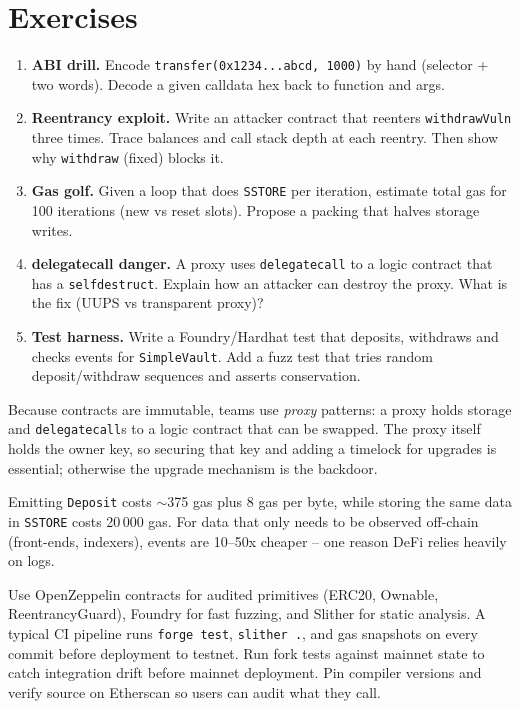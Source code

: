 \section{Exercises}\label{sec:ch04-exercises}
\begin{enumerate}[label=E4.\arabic*, leftmargin=*, itemsep=0.6em]
    \item \textbf{ABI drill.} Encode \texttt{transfer(0x1234...abcd, 1000)} by hand (selector + two words). Decode a given calldata hex back to function and args.
    \item \textbf{Reentrancy exploit.} Write an attacker contract that reenters \texttt{withdrawVuln} three times. Trace balances and call stack depth at each reentry. Then show why \texttt{withdraw} (fixed) blocks it.
    \item \textbf{Gas golf.} Given a loop that does \texttt{SSTORE} per iteration, estimate total gas for 100 iterations (new vs reset slots). Propose a packing that halves storage writes.
    \item \textbf{delegatecall danger.} A proxy uses \texttt{delegatecall} to a logic contract that has a \texttt{selfdestruct}. Explain how an attacker can destroy the proxy. What is the fix (UUPS vs transparent proxy)?
    \item \textbf{Test harness.} Write a Foundry/Hardhat test that deposits, withdraws and checks events for \texttt{SimpleVault}. Add a fuzz test that tries random deposit/withdraw sequences and asserts conservation.
\end{enumerate}

\begin{remark}[Upgradeability]\label{rem:upgrade}
Because contracts are immutable, teams use \emph{proxy} patterns: a proxy holds storage and \texttt{delegatecall}s to a logic contract that can be swapped. The proxy itself holds the owner key, so securing that key and adding a timelock for upgrades is essential; otherwise the upgrade mechanism is the backdoor.
\end{remark}

\begin{example}\label{ex:events}
Emitting \texttt{Deposit} costs $\sim$375 gas plus 8 gas per byte, while storing the same data in \texttt{SSTORE} costs 20\,000 gas. For data that only needs to be observed off-chain (front-ends, indexers), events are 10--50x cheaper -- one reason DeFi relies heavily on logs.
\end{example}

\begin{remark}\label{rem:tooling}
Use OpenZeppelin contracts for audited primitives (ERC20, Ownable, ReentrancyGuard), Foundry for fast fuzzing, and Slither for static analysis. A typical CI pipeline runs \texttt{forge test}, \texttt{slither .}, and gas snapshots on every commit before deployment to testnet. Run fork tests against mainnet state to catch integration drift before mainnet deployment. Pin compiler versions and verify source on Etherscan so users can audit what they call.
\end{remark}

